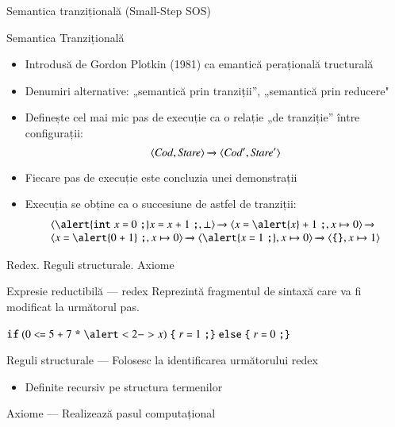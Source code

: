 \documentclass[xcolor=pdftex,romanian,colorlinks]{beamer}
\begin{document}
\begin{section}{Semantica tranzițională (Small-Step SOS)}
  \begin{frame}{Semantica Tranzițională}
  \begin{itemize}
  \item Introdusă de Gordon Plotkin (1981) ca emantică perațională tructurală
  \item Denumiri alternative: „semantică prin tranziții”, „semantică prin reducere"
  \item Definește cel mai mic pas de execuție ca o relație „de tranziție” între configurații:
  $$\displaystyle{\ensuremath {{\langle{{\it Cod}, {\it Stare}}\rangle}} \xrightarrow{} {{\ensuremath \langle{{\it Cod'}, {\it Stare'}}\rangle}}}$$
  \item Fiecare pas de execuție este concluzia unei demonstrații
  \item Execuția se obține ca o succesiune de astfel de tranziții:
  $$\begin{array}{l}\Ss{\c{\alert{\Sint x \terminal{=} 0 \terminal{;}}  x \terminal{=} x \terminal{+} 1 \terminal{;},\bot}}{\Ss{\c{x \terminal{=} \alert{x} \terminal{+} 1 \terminal{;},x \mapsto 0}}{}}
  \\
  \Ss{\c{x \terminal{=} \alert{0 \terminal{+} 1} \terminal{;},x \mapsto 0}}{\Ss{\c{\alert{x \terminal{=} 1 \terminal{;}},x \mapsto 0}}{{\c{\terminal{\{}\terminal{\}},x \mapsto 1}}}}
  \end{array}$$
  \end{itemize}
  \end{frame}

  \begin{frame}{Redex. Reguli structurale. Axiome}
  \begin{block}{\alert{Ex}presie \alert{red}uctibilă --- \alert{redex}}
  Reprezintă fragmentul de sintaxă care va fi modificat la următorul pas.

  \hfill$\Sif (0 \terminal{<=} 5 \terminal{+} 7 \terminal{*} \alert<2->{x}) \terminal{\{} r \terminal{=}1\terminal{;} \terminal{\}}\ \Selse\ \terminal{\{} r \terminal{=}0\terminal{;} \terminal{\}} $\hfill\
  \end{block}

  \begin{block}{Reguli structurale --- Folosesc la identificarea următorului redex}
  \begin{itemize}
  \item Definite recursiv pe structura termenilor
  \end{itemize}
  \end{block}
  \begin{block}{Axiome --- Realizează pasul computațional}
  \onslide<4>{$$\reg{\Ss{\c{\Sif (\terminal{true})\; {\it bl}_1 \Selse {\it bl}_2,\sigma}}{\c{{\it bl}_1,\sigma}}}{}{}$$}
  \end{block}
  \end{frame}
  \end{section}
\end{document}
